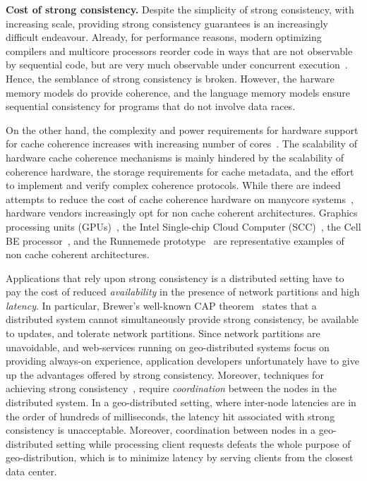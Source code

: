 \noindent \textbf{Cost of strong consistency.} Despite the simplicity of strong
consistency, with increasing scale, providing strong consistency guarantees is
an increasingly difficult endeavour. Already, for performance reasons, modern
optimizing compilers and multicore processors reorder code in ways that are not
observable by sequential code, but are very much observable under concurrent
execution~\cite{Demange2013,Sewell2010,Sarkar2011,Batty2011}. Hence, the
semblance of strong consistency is broken. However, the harware memory models
do provide coherence, and the language memory models ensure sequential
consistency for programs that do not involve data races.

On the other hand, the complexity and power requirements for hardware support
for cache coherence increases with increasing number of
cores~\cite{Kavadis2010}. The scalability of hardware cache coherence
mechanisms is mainly hindered by the scalability of coherence hardware, the
storage requirements for cache metadata, and the effort to implement and verify
complex coherence protocols. While there are indeed attempts to reduce the cost
of cache coherence hardware on manycore systems~\cite{Martin2012}, hardware
vendors increasingly opt for non cache coherent architectures. Graphics
processing units (GPUs)~\cite{Luebke2004}, the Intel Single-chip Cloud Computer
(SCC)~\cite{Mattson2010}, the Cell BE processor~\cite{Kahle2005}, and the
Runnemede prototype~\cite{Carter2013} are representative examples of non cache
coherent architectures.

Applications that rely upon strong consistency is a distributed setting have to
pay the cost of reduced \emph{availability} in the presence of network
partitions and high \emph{latency}. In particular, Brewer's well-known CAP
theorem~\cite{Brewer2000,Gilbert2002} states that a distributed system cannot
simultaneously provide strong consistency, be available to updates, and
tolerate network partitions. Since network partitions are unavoidable, and
web-services running on geo-distributed systems focus on providing always-on
experience, application developers unfortunately have to give up the advantages
offered by strong consistency. Moreover, techniques for achieving strong
consistency~\cite{}, require \emph{coordination} between the nodes in the
distributed system. In a geo-distributed setting, where inter-node latencies
are in the order of hundreds of milliseconds, the latency hit associated with
strong consistency is unacceptable. Moreover, coordination between nodes in a
geo-distributed setting while processing client requests defeats the whole
purpose of geo-distribution, which is to minimize latency by serving clients
from the closest data center.

